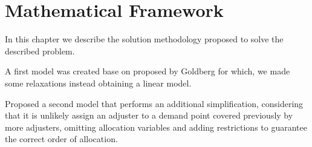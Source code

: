 \section{Mathematical Framework}
In this chapter
we describe the solution methodology proposed
to solve the described problem.

A first model was created
base on proposed by Goldberg \cite{goldberg1990validating}
for which,
we made some relaxations
instead obtaining a linear model.

Proposed a second model
that performs an additional simplification,
considering that
it is unlikely
assign an adjuster
to a demand point
covered previously
by more adjusters,
omitting allocation variables
and adding restrictions
to guarantee
the correct order of allocation.
